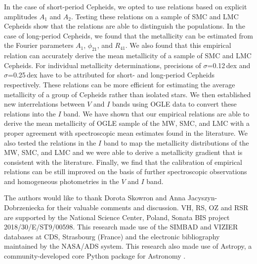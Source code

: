 \documentclass[article]{aa} %
\begin{document}
In the case of short-period Cepheids, we opted to use relations based on explicit amplitudes $A_1$ and $A_2$. Testing these relations on a sample of SMC and LMC Cepheids show that the relations are able to distinguish the populations. In the case of long-period Cepheids, we found that the metallicity can be estimated from the Fourier parameters $A_1$, $\phi_{21}$, and $R_{41}$. We also found that this empirical relation can accurately derive the mean metallicity of a sample of SMC and LMC Cepheids. For individual metallicity determinations, precisions of $\sigma$=0.12$\,$dex and $\sigma$=0.25$\,$dex have to be attributed for short- and long-period Cepheids respectively. These relations can be more efficient for estimating the average metallicity of a group of Cepheids rather than isolated stars.
 We then established new interrelations between $V$ and $I$ bands using OGLE data to convert these relations into the $I$ band.
We have shown that our empirical relations are able to derive the mean metallicity of OGLE sample of the MW, SMC, and LMC with a proper agreement with spectroscopic mean estimates found in the literature. We also tested the relations in the $I$ band to map the metallicity distributions of the MW, SMC, and LMC and we were able to derive a metallicity gradient that is consistent with the literature. 
Finally, we find that the calibration of empirical relations can be still improved on the basis of  further spectroscopic observations and homogeneous photometries in the $V$ and $I$ band.


\begin{acknowledgements}The authors would like to thank Dorota Skowron and Anna Jacyszyn-Dobrzeniecka for their valuable comments and discussion.
VH, RS, OZ and RSR are supported by the National Science Center, Poland,
Sonata BIS project 2018/30/E/ST9/00598. This research made use of the SIMBAD and VIZIER databases at CDS, Strasbourg (France) and the electronic bibliography maintained by the NASA/ADS system. This research also made use of Astropy, a community-developed core Python package for Astronomy \citep{astropy2018,astropy2022}. 
\end{acknowledgements}


\end{document}
